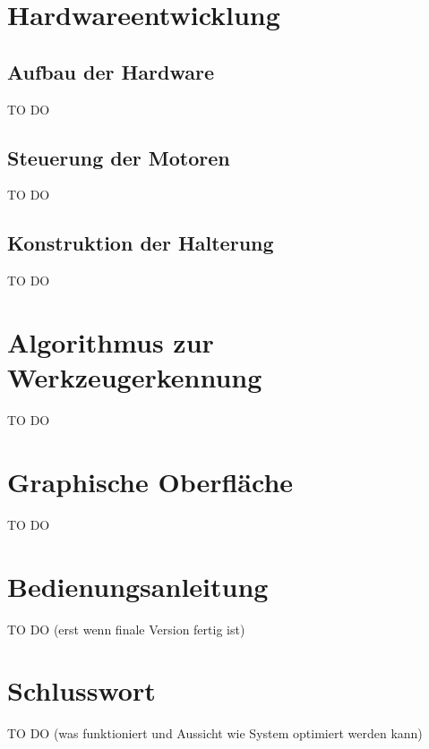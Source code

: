 \documentclass[a4paper]{report}
\begin{document}
\chapter{Hardwareentwicklung}
\section{Aufbau der Hardware}
TO DO
\section{Steuerung der Motoren}
TO DO
\section{Konstruktion der Halterung}
TO DO

\chapter{Algorithmus zur Werkzeugerkennung}
TO DO

\chapter{Graphische Oberfläche}
TO DO

\chapter{Bedienungsanleitung}
TO DO (erst wenn finale Version fertig ist)


\chapter{Schlusswort}
TO DO (was funktioniert und Aussicht wie System optimiert werden kann)
\end{document}
